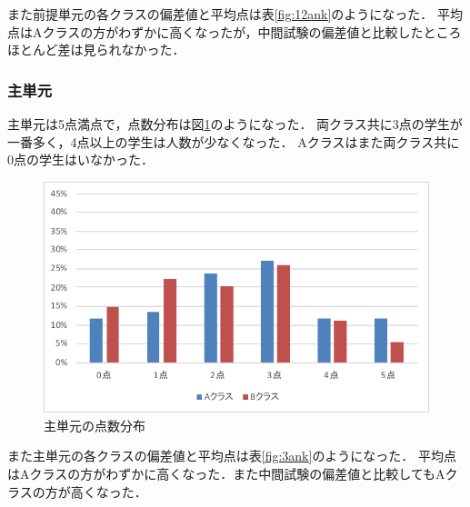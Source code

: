 \documentclass[a4j,12pt]{jsarticle}
\begin{document}
また前提単元の各クラスの偏差値と平均点は表\ref{fig:12ank}のようになった．
平均点はAクラスの方がわずかに高くなったが，中間試験の偏差値と比較したところほとんど差は見られなかった．\\
\begin{table}[H]
\centering
\caption{前提単元の偏差値と平均点}
\label{fig:12ank}
\end{table}





\newpage
\subsubsection{主単元}
主単元は5点満点で，点数分布は図\ref{fig:shuten}のようになった．
両クラス共に3点の学生が一番多く，4点以上の学生は人数が少なくなった．
Aクラスはまた両クラス共に0点の学生はいなかった．

\begin{figure}[H]
\centering
\includegraphics[width=12cm]{3test.pdf}
\caption{主単元の点数分布}
\label{fig:shuten}
\end{figure} 

また主単元の各クラスの偏差値と平均点は表\ref{fig:3ank}のようになった．
平均点はAクラスの方がわずかに高くなった．また中間試験の偏差値と比較してもAクラスの方が高くなった．\\
\end{document}
